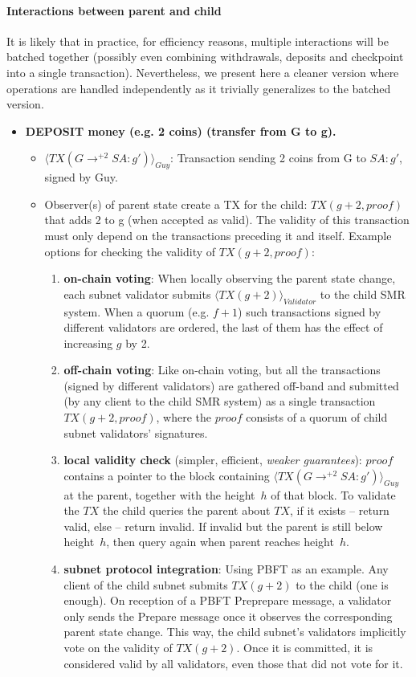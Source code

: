 \paragraph{Interactions between parent and child}
It is likely that in practice, for efficiency reasons, multiple interactions will be batched together (possibly even combining withdrawals, deposits and checkpoint into a single transaction).
Nevertheless, we present here a cleaner version where operations are handled independently as it trivially generalizes to the batched version.
\begin{itemize}
    \item \textbf{DEPOSIT money (e.g. 2 coins) (transfer from G to g).}
    \begin{itemize}
        \item $\langle TX(G \rightarrow^{+2} SA:g')\rangle_{Guy}$: Transaction sending 2 coins from G to $SA:g'$, signed by Guy.
        \item Observer(s) of parent state create a TX for the child: $TX(g+2, proof)$ that adds 2 to g (when accepted as valid). The validity of this transaction must only depend on the transactions preceding it and itself.
        Example options for checking the validity of $TX(g+2, proof)$:
        \begin{enumerate}
            \item \textbf{on-chain voting}:
            When locally observing the parent state change, each subnet validator submits $\langle TX(g+2)\rangle_{Validator}$ to the child SMR system.
            When a quorum (e.g. $f+1$) such transactions signed by different validators are ordered, the last of them has the effect of increasing $g$ by 2.
            \item \textbf{off-chain voting}:
            Like on-chain voting, but all the transactions (signed by different validators) are gathered off-band and submitted (by any client to the child SMR system) as a single transaction $TX(g+2, proof)$, where the $proof$ consists of a quorum of child subnet validators' signatures.
            \item \textbf{local validity check} (simpler, efficient, \textit{weaker guarantees}): $proof$ contains a pointer to the block containing $\langle TX(G \rightarrow^{+2} SA:g')\rangle_{Guy}$ at the parent, together with the height~$h$ of that block.
            To validate the $TX$ the child queries the parent about $TX$, if it exists -- return valid, else -- return invalid. If invalid but the parent is still below height~$h$, then query again when parent reaches height~$h$.
            \item \textbf{subnet protocol integration}: Using PBFT as an example. Any client of the child subnet submits $TX(g+2)$ to the child (one is enough). On reception of a PBFT Preprepare message, a validator only sends the Prepare message once it observes the corresponding parent state change. This way, the child subnet's validators implicitly vote on the validity of $TX(g+2)$. Once it is committed, it is considered valid by all validators, even those that did not vote for it.
        \end{enumerate}
    \end{itemize}
    

\end{itemize}
